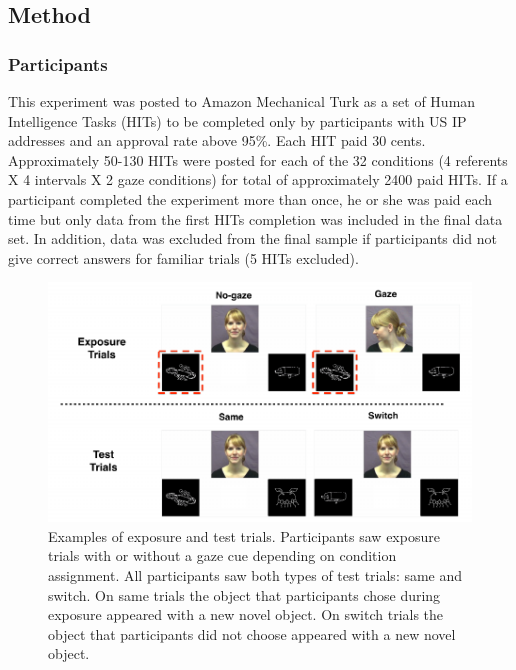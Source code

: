 \documentclass[a4paper,man,natbib]{apa6}
\newenvironment{CodeChunk}{}{}
\begin{document}
\subsection{Method}\label{method}

\subsubsection{Participants}\label{participants}

This experiment was posted to Amazon Mechanical Turk as a set of Human
Intelligence Tasks (HITs) to be completed only by participants with US
IP addresses and an approval rate above 95\%. Each HIT paid 30 cents.
Approximately 50-130 HITs were posted for each of the 32 conditions (4
referents X 4 intervals X 2 gaze conditions) for total of approximately
2400 paid HITs. If a participant completed the experiment more than
once, he or she was paid each time but only data from the first HITs
completion was included in the final data set. In addition, data was
excluded from the final sample if participants did not give correct
answers for familiar trials (5 HITs excluded).

\begin{CodeChunk}
\begin{figure}
\includegraphics{figs/stimuli-1} \caption[Examples of exposure and test trials]{Examples of exposure and test trials. Participants saw exposure trials with or without a gaze cue depending on condition assignment. All participants saw both types of test trials: same and switch. On same trials the object that participants chose during exposure appeared with a new novel object. On switch trials the object that participants did not choose appeared with a new novel object.}\label{fig:stimuli}
\end{figure}
\end{CodeChunk}
\end{document}
